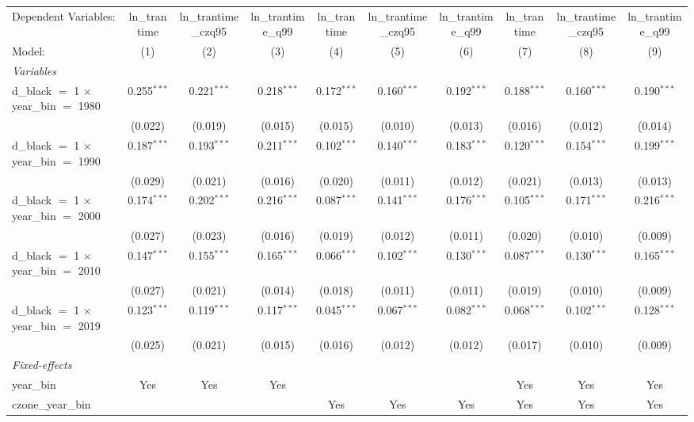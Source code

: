 \begin{tabular}{lccccccccc}
\tabularnewline\midrule\midrule
Dependent Variables:&ln\_trantime&ln\_trantime\_czq95&ln\_trantime\_q99&ln\_trantime&ln\_trantime\_czq95&ln\_trantime\_q99&ln\_trantime&ln\_trantime\_czq95&ln\_trantime\_q99\\
Model:&(1) & (2) & (3) & (4) & (5) & (6) & (7) & (8) & (9)\\
\midrule \emph{Variables}&   &   &   &   &   &   &   &   &  \\
d\_black $=$ 1 $\times $ year\_bin $=$ 1980 & 0.255$^{***}$ & 0.221$^{***}$ & 0.218$^{***}$ & 0.172$^{***}$ & 0.160$^{***}$ & 0.192$^{***}$ & 0.188$^{***}$ & 0.160$^{***}$ & 0.190$^{***}$\\
  &(0.022) & (0.019) & (0.015) & (0.015) & (0.010) & (0.013) & (0.016) & (0.012) & (0.014)\\
d\_black $=$ 1 $\times $ year\_bin $=$ 1990 & 0.187$^{***}$ & 0.193$^{***}$ & 0.211$^{***}$ & 0.102$^{***}$ & 0.140$^{***}$ & 0.183$^{***}$ & 0.120$^{***}$ & 0.154$^{***}$ & 0.199$^{***}$\\
  &(0.029) & (0.021) & (0.016) & (0.020) & (0.011) & (0.012) & (0.021) & (0.013) & (0.013)\\
d\_black $=$ 1 $\times $ year\_bin $=$ 2000 & 0.174$^{***}$ & 0.202$^{***}$ & 0.216$^{***}$ & 0.087$^{***}$ & 0.141$^{***}$ & 0.176$^{***}$ & 0.105$^{***}$ & 0.171$^{***}$ & 0.216$^{***}$\\
  &(0.027) & (0.023) & (0.016) & (0.019) & (0.012) & (0.011) & (0.020) & (0.010) & (0.009)\\
d\_black $=$ 1 $\times $ year\_bin $=$ 2010 & 0.147$^{***}$ & 0.155$^{***}$ & 0.165$^{***}$ & 0.066$^{***}$ & 0.102$^{***}$ & 0.130$^{***}$ & 0.087$^{***}$ & 0.130$^{***}$ & 0.165$^{***}$\\
  &(0.027) & (0.021) & (0.014) & (0.018) & (0.011) & (0.011) & (0.019) & (0.010) & (0.009)\\
d\_black $=$ 1 $\times $ year\_bin $=$ 2019 & 0.123$^{***}$ & 0.119$^{***}$ & 0.117$^{***}$ & 0.045$^{***}$ & 0.067$^{***}$ & 0.082$^{***}$ & 0.068$^{***}$ & 0.102$^{***}$ & 0.128$^{***}$\\
  &(0.025) & (0.021) & (0.015) & (0.016) & (0.012) & (0.012) & (0.017) & (0.010) & (0.009)\\
\midrule \emph{Fixed-effects}&   &   &   &   &   &   &   &   &  \\
year\_bin & Yes & Yes & Yes &  &  &  & Yes & Yes & Yes\\
czone\_year\_bin &  &  &  & Yes & Yes & Yes & Yes & Yes & Yes\\

\end{tabular}
